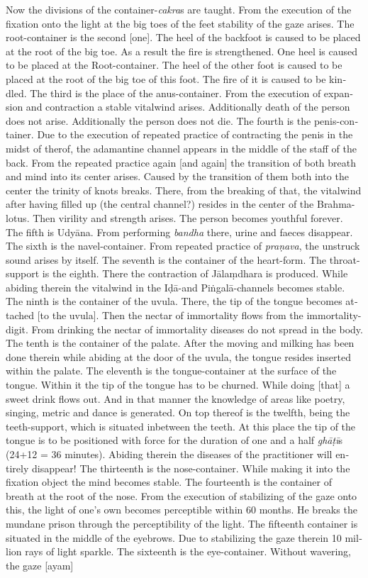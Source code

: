 \begin{otherlanguage}{english}
\begin{tlate}
Now the  divisions of the container-\textit{cakra}s are taught. From the execution of the fixation onto the light at the big toes of the feet stability of the gaze arises. The root-container is the second [one]. The heel of the backfoot is caused to be placed at the root of the big toe. As a result the fire is strengthened. One heel is caused to be placed at the Root-container. The heel of the other foot is caused to be placed at the root of the big toe of this foot. The fire of it is caused to be kindled. The third is the place of the anus-container. From the execution of expansion and contraction a stable vitalwind arises. Additionally death of the person does not arise. Additionally the person does not die. The fourth is the penis-container. Due to the execution of repeated practice of contracting the penis in the midst of therof, the adamantine channel appears in the middle of the staff of the back. From the repeated practice again [and again] the transition of both breath and mind into its center arises. Caused by the transition of them both into the center the trinity of knots breaks. There, from the breaking of that, the vitalwind after having filled up (the central channel?) resides in the center of the Brahma-lotus. Then virility and strength arises. The person becomes youthful forever. The fifth is Udyāna. From performing \textit{bandha} there, urine and faeces disappear. The sixth is the navel-container. From repeated practice of \textit{praṇava}, the unstruck sound arises by itself. The seventh is the container of the heart-form. The throat-support is the eighth. There the contraction of Jālaṃdhara is produced. While abiding therein the vitalwind in the Iḍā-and Piṅgalā-channels becomes stable. The ninth is the container of the uvula. There, the tip of the tongue becomes attached [to the uvula]. Then the nectar of immortality flows from the immortality-digit. From drinking the nectar of immortality diseases do not spread in the body. The tenth is the container of the palate. After the moving and milking has been done therein while abiding at the door of the uvula, the tongue resides inserted within the palate. The eleventh is the tongue-container at the surface of the tongue. Within it the tip of the tongue has to be churned. While doing [that] a sweet drink flows out. And in that manner the knowledge of areas like poetry, singing, metric and dance is generated. On top thereof is the twelfth, being the teeth-support, which is situated inbetween the teeth. At this place the tip of the tongue is to be positioned with force for the duration of one and a half \textit{ghāṭī}s (24+12 = 36 minutes). Abiding therein the diseases of the practitioner will entirely disappear! The thirteenth is the nose-container. While making it into the fixation object the mind becomes stable. The fourteenth is the container of breath at the root of the nose. From the execution of stabilizing of the gaze onto this, the light of one's own becomes perceptible within 60 months. He breaks the mundane prison through the perceptibility of the light. The fifteenth container is situated in the middle of the eyebrows. Due to stabilizing the gaze therein 10 million rays of light sparkle. The sixteenth is the eye-container. Without wavering, the gaze [ayam] 
\end{tlate}
\end{otherlanguage}
